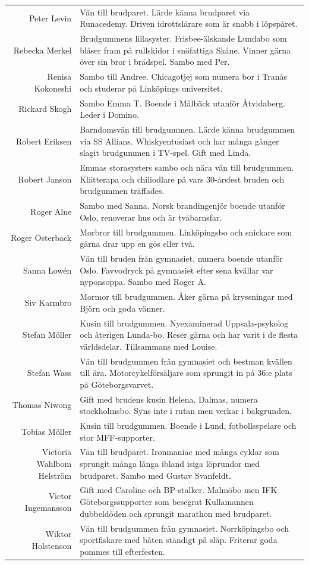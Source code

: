 \documentclass[a5paper]{article}
\begin{document}
\begin{longtable}[l]{N|L}
				Peter Levin	&	Vän till brudparet. Lärde känna brudparet via Runacedemy. Driven idrottslärare som är snabb i löpspåret.	\\
				Rebecka Merkel	&	Brudgummens lillasyster. Frisbee-älskande Lundabo som blåser fram på rullskidor i snöfattiga Skåne. Vinner gärna över sin bror i brädspel. Sambo med Per. 	\\
				Renisa Kokoneshi	&	Sambo till Andree. Chicagotjej som numera bor i Tranås och studerar på Linköpings universitet.	\\
				Rickard Skogh	&	Sambo Emma T. Boende i Målbäck utanför Åtvidaberg. Leder i Domino. \\
				Robert Eriksen	&	Barndomsvän till brudgummen. Lärde känna brudgummen via SS Allians. Whiskyentusiast och har många gånger slagit brudgummen i TV-spel. Gift med Linda. 	\\
				Robert Janson	&	Emmas storasysters sambo och nära vän till brudgummen. Klätterapa och chiliodlare på vars 30-årsfest bruden och brudgummen träffades.	\\
				Roger Alne	&	Sambo med Sanna. Norsk brandingenjör boende utanför Oslo, renoverar hus och är tvåbarnsfar.	\\
				Roger Österback	&	Morbror till brudgummen. Linköpingsbo och snickare som gärna drar upp en gös eller två.	\\
				Sanna Lowén	&	Vän till bruden från gymnasiet, numera boende utanför Oslo. Favvodryck på gymnasiet efter sena kvällar var nyponsoppa. Sambo med Roger A.	\\
				Siv Karmbro	&	Mormor till brudgummen. Åker gärna på kryssningar med Björn och goda vänner.	\\
				Stefan Möller	&	Kusin till brudgummen. Nyexaminerad Uppsala-psykolog och återigen Lunda-bo. Reser gärna och har varit i de flesta världsdelar. Tillsammans med Louise.	\\
				Stefan Wass	&	Vän till brudgummen från gymnasiet och bestman kvällen till ära. Motorcykelförsäljare som sprungit in på 36:e plats på Göteborgsvarvet.	\\
				Thomas Niwong	&	Gift med brudens kusin Helena. Dalmas, numera stockholmsbo. Syns inte i rutan men verkar i bakgrunden.	\\
				Tobias Möller	&	Kusin till brudgummen. Boende i Lund, fotbollsspelare och stor MFF-supporter.	\\
				Victoria Wahlbom Helström	&	Vän till brudparet. Ironmaniac med många cyklar som sprungit många långa ibland isiga löprundor med brudparet. Sambo med Gustav Svanfeldt.	\\
				Victor Ingemansson	&	Gift med Caroline och BP-stalker. Malmöbo men IFK Göteborgssupporter som besegrat Kullamannen dubbeldöden och sprungit marathon med brudparet.	\\
				Wiktor Holstenson	&	Vän till brudgummen från gymnasiet. Norrköpingsbo och sportfiskare med båten ständigt på släp. Friterar goda pommes till efterfesten. 	\\
		\end{longtable}
	
\end{document}

